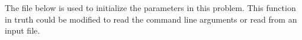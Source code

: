 The file below is used to initialize the parameters in this problem. This function in truth could be modified to read the command line arguments or read from an input file.
